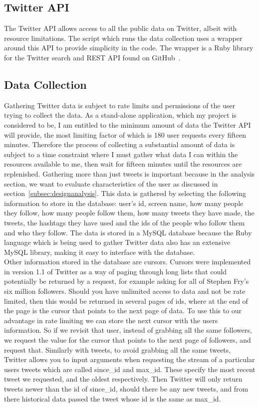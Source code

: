 \documentclass[a4paper]{article}
\begin{document}
\subsection{Twitter API}
The Twitter API allows access to all the public data on Twitter, albeit with resource limitations. The script which runs the data collection uses a wrapper around this API to provide simplicity in the code. The wrapper is a Ruby library for the Twitter search and REST API found on GitHub~\cite{sferik}. 
\subsection{Data Collection}
Gathering Twitter data is subject to rate limits and permissions of the user trying to collect the data. As a stand-alone application, which my project is considered to be, I am entitled to the minimum amount of data the Twitter API will provide, the most limiting factor of which is 180 user requests every fifteen minutes. Therefore the process of collecting a substantial amount of data is subject to a time constraint where I must gather what data I can within the resources available to me, then wait for fifteen minutes until the resources are replenished.
Gathering more than just tweets is important because in the analysis section, we want to evaluate characteristics of the user as discussed in section~\ref{subsec:designanalysis}. This data is gathered by selecting the following information to store in the database: user's id, screen name, how many people they follow, how many people follow them, how many tweets they have made, the tweets, the hashtags they have used and the ids of the people who follow them and who they follow. The data is stored in a MySQL database because the Ruby language which is being used to gather Twitter data also has an extensive MySQL library, making it easy to interface with the database.\\ 
Other information stored in the database are cursors. Cursors were implemented in version 1.1 of Twitter as a way of paging through long lists that could potentially be returned by a request, for example asking for all of Stephen Fry's six million followers. Should you have unlimited access to data and not be rate limited, then this would be returned in several pages of ids, where at the end of the page is the cursor that points to the next page of data. To use this to our advantage in rate limiting we can store the next cursor with the users information. So if we revisit that user, instead of grabbing all the same followers, we request the value for the cursor that points to the next page of followers, and request that. 
Similarly with tweets, to avoid grabbing all the same tweets, Twitter allows you to input arguments when requesting the stream of a particular users tweets which are called since\_id and max\_id. These specify the most recent tweet we requested, and the oldest respectively. Then Twitter will only return tweets newer than the id of since\_id, should there be any new tweets, and from there historical data passed the tweet whose id is the same as max\_id. 
\end{document}
